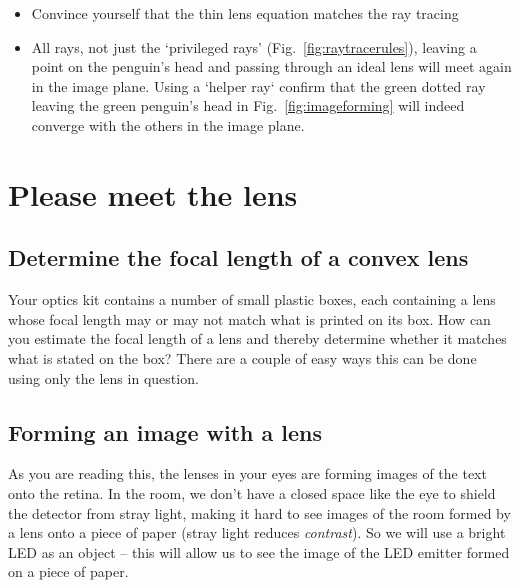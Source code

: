 \documentclass[a4paper]{report}
\begin{document}
	\begin{itemize}
	    \item Convince yourself that the thin lens equation matches the ray tracing
	    \item All rays, not just the `privileged rays' (Fig.~\ref{fig:raytracerules}), leaving a point on the penguin's head and passing through an ideal lens will meet again in the image plane. Using a `helper ray` confirm that the green dotted ray leaving the green penguin's head in Fig.~\ref{fig:imageforming} will indeed converge with the others in the image plane. 
	\end{itemize}
	

    \clearpage

	\section{Please meet the lens}
	
    \subsection{Determine the focal length of a convex lens}
	\hypertarget{hintBack-focal_length}{}
	Your optics kit contains a number of small plastic boxes, each containing a lens whose focal length may or may not match what is printed on its box. 
	How can you estimate the focal length of a lens and thereby determine whether it matches what is stated on the box? 
    There are a couple of easy ways this can be done using only the lens in question. 

	
	
    \subsection{Forming an image with a lens}
	\hypertarget{hintBack-image}{}
	As you are reading this, the lenses in your eyes are forming images of the text onto the retina. 
	In the room, we don't have a closed space like the eye to shield the detector from stray light, making it hard to see images of the room formed by a lens onto a piece of paper (stray light reduces \emph{contrast}). 
	So we will use a bright LED as an object -- this will allow us to see the image of the LED emitter formed on a piece of paper.
	
\end{document}
